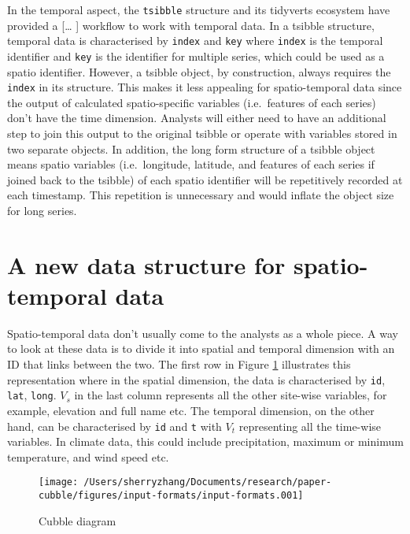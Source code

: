 \documentclass[
]{jss}
\begin{document}
In the temporal aspect, the \texttt{tsibble} \citep{tsibbles} structure
and its tidyverts ecosystem have provided a {[}\ldots{} {]} workflow to
work with temporal data. In a tsibble structure, temporal data is
characterised by \texttt{index} and \texttt{key} where \texttt{index} is
the temporal identifier and \texttt{key} is the identifier for multiple
series, which could be used as a spatio identifier. However, a tsibble
object, by construction, always requires the \texttt{index} in its
structure. This makes it less appealing for spatio-temporal data since
the output of calculated spatio-specific variables (i.e.~features of
each series) don't have the time dimension. Analysts will either need to
have an additional step to join this output to the original tsibble or
operate with variables stored in two separate objects. In addition, the
long form structure of a tsibble object means spatio variables
(i.e.~longitude, latitude, and features of each series if joined back to
the tsibble) of each spatio identifier will be repetitively recorded at
each timestamp. This repetition is unnecessary and would inflate the
object size for long series.

\hypertarget{a-new-data-structure-for-spatio-temporal-data}{%
\section{A new data structure for spatio-temporal
data}\label{a-new-data-structure-for-spatio-temporal-data}}

Spatio-temporal data don't usually come to the analysts as a whole
piece. A way to look at these data is to divide it into spatial and
temporal dimension with an ID that links between the two. The first row
in Figure \ref{fig:cubble-diagram} illustrates this representation where
in the spatial dimension, the data is characterised by \texttt{id},
\texttt{lat}, \texttt{long}. \(V_s\) in the last column represents all
the other site-wise variables, for example, elevation and full name etc.
The temporal dimension, on the other hand, can be characterised by
\texttt{id} and \texttt{t} with \(V_t\) representing all the time-wise
variables. In climate data, this could include precipitation, maximum or
minimum temperature, and wind speed etc.

\begin{CodeChunk}
\begin{figure}

{\centering \texttt{[image: /Users/sherryzhang/Documents/research/paper-cubble/figures/input-formats/input-formats.001]} 

}

\caption[Cubble diagram]{Cubble diagram}\label{fig:cubble-diagram}
\end{figure}
\end{CodeChunk}
\end{document}
